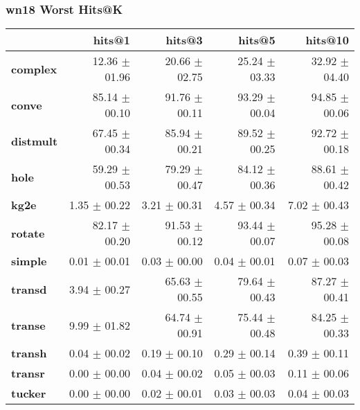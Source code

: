 \documentclass{article}
\begin{document}
\subsubsection{wn18 Worst Hits@K}
    \begin{center}
    \begin{tabular}{lrrrr}
\toprule
{} &         hits@1 &         hits@3 &         hits@5 &        hits@10 \\
\midrule
\textbf{complex } &  12.36 $\pm$ 01.96 &  20.66 $\pm$ 02.75 &  25.24 $\pm$ 03.33 &  32.92 $\pm$ 04.40 \\
\textbf{conve   } &  85.14 $\pm$ 00.10 &  91.76 $\pm$ 00.11 &  93.29 $\pm$ 00.04 &  94.85 $\pm$ 00.06 \\
\textbf{distmult} &  67.45 $\pm$ 00.34 &  85.94 $\pm$ 00.21 &  89.52 $\pm$ 00.25 &  92.72 $\pm$ 00.18 \\
\textbf{hole    } &  59.29 $\pm$ 00.53 &  79.29 $\pm$ 00.47 &  84.12 $\pm$ 00.36 &  88.61 $\pm$ 00.42 \\
\textbf{kg2e    } &   1.35 $\pm$ 00.22 &   3.21 $\pm$ 00.31 &   4.57 $\pm$ 00.34 &   7.02 $\pm$ 00.43 \\
\textbf{rotate  } &  82.17 $\pm$ 00.20 &  91.53 $\pm$ 00.12 &  93.44 $\pm$ 00.07 &  95.28 $\pm$ 00.08 \\
\textbf{simple  } &   0.01 $\pm$ 00.01 &   0.03 $\pm$ 00.00 &   0.04 $\pm$ 00.01 &   0.07 $\pm$ 00.03 \\
\textbf{transd  } &   3.94 $\pm$ 00.27 &  65.63 $\pm$ 00.55 &  79.64 $\pm$ 00.43 &  87.27 $\pm$ 00.41 \\
\textbf{transe  } &   9.99 $\pm$ 01.82 &  64.74 $\pm$ 00.91 &  75.44 $\pm$ 00.48 &  84.25 $\pm$ 00.33 \\
\textbf{transh  } &   0.04 $\pm$ 00.02 &   0.19 $\pm$ 00.10 &   0.29 $\pm$ 00.14 &   0.39 $\pm$ 00.11 \\
\textbf{transr  } &   0.00 $\pm$ 00.00 &   0.04 $\pm$ 00.02 &   0.05 $\pm$ 00.03 &   0.11 $\pm$ 00.06 \\
\textbf{tucker  } &   0.00 $\pm$ 00.00 &   0.02 $\pm$ 00.01 &   0.03 $\pm$ 00.03 &   0.04 $\pm$ 00.03 \\
\bottomrule
\end{tabular}

    \end{center}
\end{document}
